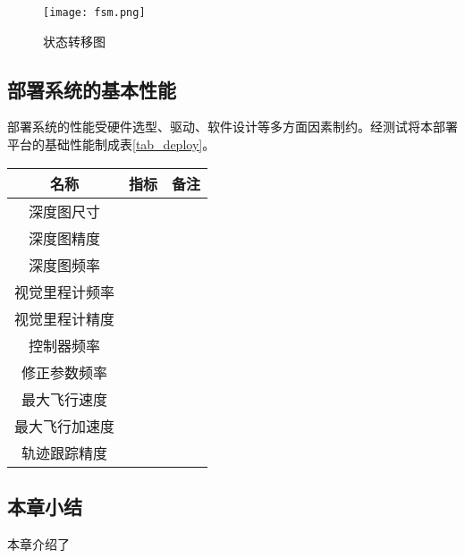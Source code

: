 \begin{figure}
    \centering
    \texttt{[image: fsm.png]}
    \caption{状态转移图}
    \label{fig_fsm}
\end{figure}

\subsection{部署系统的基本性能}
部署系统的性能受硬件选型、驱动、软件设计等多方面因素制约。经测试将本部署平台的基础性能制成表\ref{tab_deploy}。

\begin{table}
    \centering
    \begin{tabular}{ccc}
    \hline
         名称 & 指标 & 备注 \\ \hline
        深度图尺寸 & ~ & ~ \\ 
        深度图精度 & ~ & ~ \\ 
        深度图频率 & ~ & ~ \\ 
        视觉里程计频率 & ~ & ~ \\ 
        视觉里程计精度 & ~ & ~ \\ 
        控制器频率 & ~ & ~ \\ 
        修正参数频率 & ~ & ~ \\ 
        最大飞行速度 & ~ & ~ \\ 
        最大飞行加速度 & ~ & ~ \\ 
         轨迹跟踪精度 & ~ & ~ \\ \hline
    \end{tabular}
\end{table}

\subsection{本章小结}

本章介绍了






